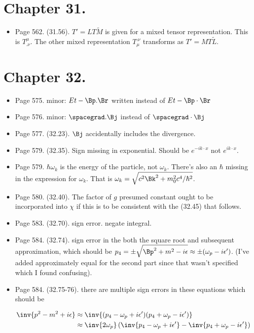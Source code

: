 \section{Chapter 31.}
\begin{itemize}
\item Page 562.  (31.56).  $T' = L T \tilde{M}$ is given for a mixed tensor representation.  This is $T^\mu_{.\nu}$.  The other mixed representation $T_{\mu}^{.\nu}$ transforms as $T' = M T \tilde{L}$.
\end{itemize}

\section{Chapter 32.}
\begin{itemize}
\item Page 575.  minor: $E t - \Bp . \Br$ written instead of $E t - \Bp \cdot \Br$
\item Page 576.  minor: $\spacegrad . \Bj$ instead of $\spacegrad \cdot \Bj$
\item Page 577.  (32.23).  $\Bj$ accidentally includes the divergence.
\item Page 579.  (32.35).  Sign missing in exponential.  Should be $e^{-i k \cdot x}$ not $e^{i k \cdot x}$.
\item Page 579.  $\hbar \omega_k$ is the energy of the particle, not $\omega_k$.  There's also an $\hbar$ missing in the expression for $\omega_k$.  That is $\omega_k = \sqrt{ c^2 \Bk^2 + m_0^2 c^4/\hbar^2}$.
\item Page 580.  (32.40).  The factor of $g$ presumed constant ought to be incorporated into $\chi$ if this is to be consistent with the (32.45) that follows.
\item Page 583.  (32.70).  sign error.  negate integral.
\item Page 584.  (32.74).  sign error in the both the square root and subsequent approximation, which should be $p_4 = \pm \sqrt{ \Bp^2 + m^2 - i \epsilon} \approx \pm (\omega_p - i \epsilon')$.  (I've added approximately equal for the second part since that wasn't specified which I found confusing).
\item Page 584.  (32.75-76).  there are multiple sign errors in these equations which should be

\begin{align*}
\inv{p^2 - m^2 + i\epsilon} 
&\approx \inv{
(p_4 - \omega_p + i\epsilon')
(p_4 + \omega_p - i\epsilon')
} \\
&\approx
\inv{2 \omega_p}\left(
\inv{p_4 - \omega_p + i\epsilon'}
-\inv{p_4 + \omega_p - i\epsilon'}
\right)
\end{align*}


\end{itemize}
